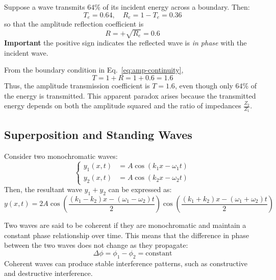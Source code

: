 \documentclass[11pt]{report}
\begin{document}
\begin{example}
Suppose a wave transmits \(64\%\) of its incident energy across a boundary. Then:
\begin{equation}
    T_e = 0.64, 
    \quad R_e = 1 - T_e = 0.36
\end{equation}
so that the amplitude reflection coefficient is
\begin{equation}
    R = +\sqrt{R_e} = 0.6 
\end{equation}
\textbf{Important} the positive sign indicates the reflected wave is \emph{in phase} with the incident wave.

From the boundary condition in Eq.~\eqref{eq:amp-continuity},
\begin{equation}
    T = 1 + R = 1 + 0.6 = 1.6
\end{equation}
Thus, the amplitude transmission coefficient is \(T = 1.6\), even though only \(64\%\) of the energy is transmitted. This apparent paradox arises because the transmitted energy depends on both the amplitude squared and the ratio of impedances \(\tfrac{Z_2}{Z_1}\).
\end{example}
\subsection{Superposition and Standing Waves}
\begin{definition}
    Consider two monochromatic waves:
    $$
    \begin{cases}
        y_1(x,t) &= A \cos(k_1 x - \omega_1 t) \\
        y_2(x,t) &= A \cos(k_2 x - \omega_2 t)
    \end{cases}
    $$
    Then, the resultant wave $y_1 + y_2$ can be expressed as:
    \begin{equation}
        y(x,t) = 2A \cos\left(\frac{(k_1 - k_2)x - (\omega_1 - \omega_2)t}{2}\right) \cos\left(\frac{(k_1 + k_2)x - (\omega_1 + \omega_2)t}{2}\right)
    \end{equation}
\end{definition}

\begin{definition}[Coherence]
    Two waves are said to be coherent if they are monochromatic and maintain a constant phase relationship over time. This means that the difference in phase between the two waves does not change as they propagate:
    \begin{equation}
        \Delta \phi = \phi_1 - \phi_2 = \text{constant}
    \end{equation}
    Coherent waves can produce stable interference patterns, such as constructive and destructive interference.
\end{definition}
\end{document}
